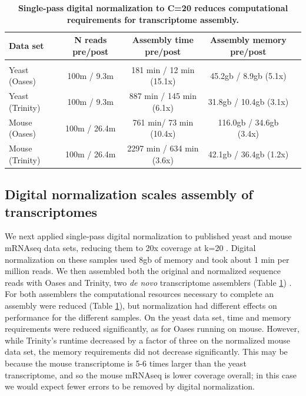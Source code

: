 % 


\begin{table}[!ht]
\small
\caption{
\bf{Single-pass digital normalization to C=20 reduces computational
requirements for transcriptome assembly.}}


\begin{tabular}{|l|c|c|c|c|}

Data set & N reads pre/post & Assembly time pre/post & Assembly memory pre/post \\
 \hline \\
Yeast (Oases) & 100m / 9.3m & 181 min / 12 min (15.1x) & 45.2gb / 8.9gb (5.1x) \\
Yeast (Trinity) & 100m / 9.3m & 887 min / 145 min (6.1x) & 31.8gb / 10.4gb (3.1x) \\
Mouse (Oases) & 100m / 26.4m & 761 min/ 73 min (10.4x) & 116.0gb / 34.6gb (3.4x) \\
Mouse (Trinity) & 100m / 26.4m & 2297 min / 634 min (3.6x) & 42.1gb / 36.4gb (1.2x) \\
\end{tabular}

\begin{flushleft}
\end{flushleft}
\label{tab:dntrans}
\end{table}


\subsection{Digital normalization scales assembly of transcriptomes}


We next applied single-pass digital normalization to published yeast and mouse
mRNAseq data sets, reducing them to 20x coverage at k=20 \cite{pubmed21572440}.
Digital normalization on these samples used 8gb of memory and took about 1 min
per million reads.  We then assembled both the original and normalized sequence
reads with Oases and Trinity, two {\em de novo} transcriptome assemblers (Table
\ref{tab:dntrans}) \cite{pubmed22368243,pubmed21572440}.
%
For both assemblers the computational resources necessary to complete an
assembly were reduced (Table \ref{tab:dntrans}), but normalization had
different effects on performance for the different samples.  On the yeast data
set, time and memory requirements were reduced significantly, as for Oases
running on mouse.  However, while Trinity's runtime decreased by a factor of
three on the normalized mouse data set, the memory requirements did not
decrease significantly.  This may be because the mouse transcriptome is 5-6
times larger than the yeast transcriptome, and so the mouse mRNAseq is lower
coverage overall; in this case we would expect fewer errors to be removed by
digital normalization.



